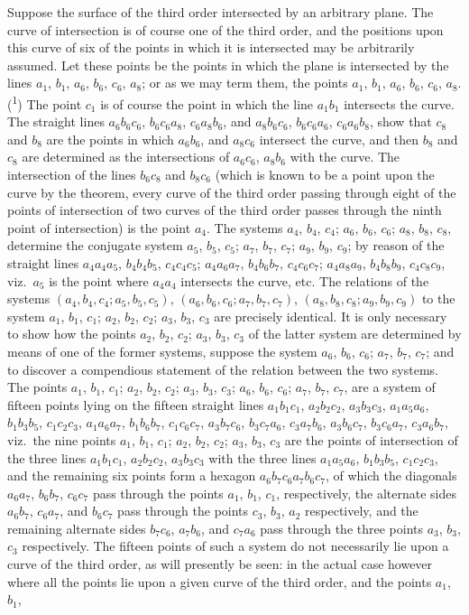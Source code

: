 \documentclass[11pt,a4paper]{book}
\begin{document}
Suppose the surface of the third order intersected by an arbitrary plane. The curve of intersection is of course one of the third order, and the positions upon this curve of six of the points in which it is intersected may be arbitrarily assumed. Let these points be the points in which the plane is intersected by the lines $a_1$, $b_1$, $a_6$, $b_6$, $c_6$, $a_8$; or as we may term them, the points $a_1$, $b_1$, $a_6$, $b_6$, $c_6$, $a_8$.(\textsuperscript{1}) The point $c_1$ is of course the point in which the line $a_1b_1$ intersects the curve. The straight lines $a_6b_6c_6$, $b_6c_6a_8$, $c_6a_8b_6$, and $a_8b_6c_6$, $b_6c_6a_6$, $c_6a_6b_8$, show that $c_8$ and $b_8$ are the points in which $a_6b_6$, and $a_8c_6$ intersect the curve, and then $b_8$ and $c_8$ are determined as the intersections of $a_6c_6$, $a_8b_6$ with the curve. The intersection of the lines $b_6c_8$ and $b_8c_6$ (which is known to be a point upon the curve by the theorem, every curve of the third order passing through eight of the points of intersection of two curves of the third order passes through the ninth point of intersection) is the point $a_4$. The systems $a_4$, $b_4$, $c_4$; $a_6$, $b_6$, $c_6$; $a_8$, $b_8$, $c_8$, determine the conjugate system $a_5$, $b_5$, $c_5$; $a_7$, $b_7$, $c_7$; $a_9$, $b_9$, $c_9$; by reason of the straight lines $a_4a_4a_5$, $b_4b_4b_5$, $c_4c_4c_5$; $a_4a_6a_7$, $b_4b_6b_7$, $c_4c_6c_7$; $a_4a_8a_9$, $b_4b_8b_9$, $c_4c_8c_9$, viz.\ $a_5$ is the point where $a_4a_4$ intersects the curve, etc. The relations of the systems $(a_4, b_4, c_4; a_5, b_5, c_5)$, $(a_6, b_6, c_6; a_7, b_7, c_7)$, $(a_8, b_8, c_8; a_9, b_9, c_9)$ to the system $a_1$, $b_1$, $c_1$; $a_2$, $b_2$, $c_2$; $a_3$, $b_3$, $c_3$ are precisely identical. It is only necessary to show how the points $a_2$, $b_2$, $c_2$; $a_3$, $b_3$, $c_3$ of the latter system are determined by means of one of the former systems, suppose the system $a_6$, $b_6$, $c_6$; $a_7$, $b_7$, $c_7$; and to discover a compendious statement of the relation between the two systems. The points $a_1$, $b_1$, $c_1$; $a_2$, $b_2$, $c_2$; $a_3$, $b_3$, $c_3$; $a_6$, $b_6$, $c_6$; $a_7$, $b_7$, $c_7$, are a system of fifteen points lying on the fifteen straight lines $a_1b_1c_1$, $a_2b_2c_2$, $a_3b_3c_3$, $a_1a_5a_6$, $b_1b_3b_5$, $c_1c_2c_3$, $a_1a_6a_7$, $b_1b_6b_7$, $c_1c_6c_7$, $a_3b_7c_6$, $b_3c_7a_6$, $c_3a_7b_6$, $a_3b_6c_7$, $b_3c_6a_7$, $c_3a_6b_7$, viz.\ the nine points $a_1$, $b_1$, $c_1$; $a_2$, $b_2$, $c_2$; $a_3$, $b_3$, $c_3$ are the points of intersection of the three lines $a_1b_1c_1$, $a_2b_2c_2$, $a_3b_3c_3$ with the three lines $a_1a_5a_6$, $b_1b_3b_5$, $c_1c_2c_3$, and the remaining six points form a hexagon $a_6b_7c_6a_7b_6c_7$, of which the diagonals $a_6a_7$, $b_6b_7$, $c_6c_7$ pass through the points $a_1$, $b_1$, $c_1$, respectively, the alternate sides $a_6b_7$, $c_6a_7$, and $b_6c_7$ pass through the points $c_3$, $b_3$, $a_2$ respectively, and the remaining alternate sides $b_7c_6$, $a_7b_6$, and $c_7a_6$ pass through the three points $a_3$, $b_3$, $c_3$ respectively. The fifteen points of such a system do not necessarily lie upon a curve of the third order, as will presently be seen: in the actual case however where all the points lie upon a given curve of the third order, and the points $a_1$, $b_1$, 
\end{document}
